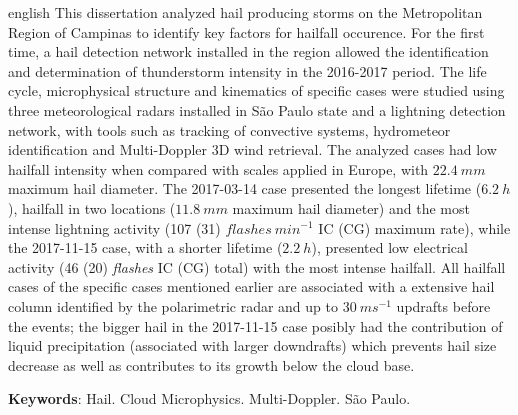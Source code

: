 \begin{resumo}[Abstract]
 \begin{otherlanguage*}{english}
   This dissertation analyzed hail producing storms on the Metropolitan Region of Campinas to identify key factors for hailfall occurence. For the first time, a hail detection network installed in the region allowed the identification and determination of thunderstorm intensity in the 2016-2017 period. The life cycle, microphysical structure and kinematics of specific cases were studied  using three meteorological radars installed in São Paulo state and a lightning detection network, with tools such as tracking of convective systems, hydrometeor identification and Multi-Doppler 3D wind retrieval. The analyzed cases had low hailfall intensity when compared with scales applied in Europe, with $22.4\:mm$ maximum hail diameter. The 2017-03-14 case presented the longest lifetime ($6.2\:h$), hailfall in two locations ($11.8\:mm$ maximum hail diameter) and the most intense lightning activity (107 (31) $flashes\:min^{-1}$ IC (CG) maximum rate), while the 2017-11-15 case, with a shorter lifetime ($2.2\:h$), presented low electrical activity (46 (20) \textit{flashes} IC (CG) total) with the most intense hailfall. All hailfall cases of the specific cases mentioned earlier are associated with a extensive hail column identified by the polarimetric radar and up to $30\:ms^{-1}$ updrafts before the events; the bigger hail in the 2017-11-15 case posibly had the contribution of liquid precipitation (associated with larger downdrafts) which prevents hail size decrease as well as contributes to its growth below the cloud base.

   \textbf{Keywords}: Hail. Cloud Microphysics. Multi-Doppler. São Paulo.
 \end{otherlanguage*}
\end{resumo}